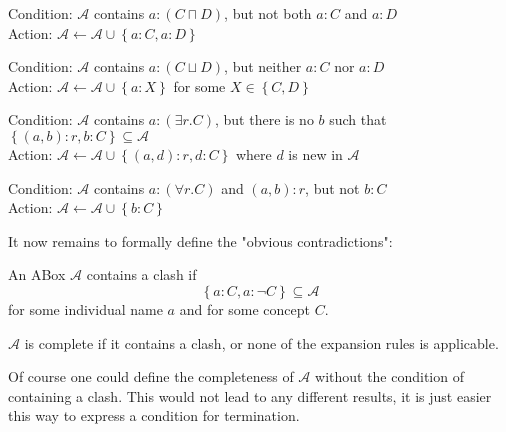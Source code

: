 \begin{mdframed}[frametitle = expansion rules]
	\begin{mdframed}[frametitle= The $\sqcap$-rule]
		Condition: $\mathcal{A}$ contains $a: (C \sqcap D)$, but not both $a:C$ and $a:D$ \\
		Action: $\mathcal{A} \leftarrow \mathcal{A} \cup \left\{ a:C, a:D \right\} $
	\end{mdframed}
	\begin{mdframed}[frametitle= The $\sqcup$-rule]
		Condition: $\mathcal{A}$ contains $a: (C \sqcup D)$, but neither $a:C$ nor $a:D$\\
		Action: $\mathcal{A} \leftarrow \mathcal{A} \cup \left\{ a:X \right\} $ for some $X \in \left\{ C,D \right\}$
	\end{mdframed}
	\begin{mdframed}[frametitle= The $\exists$-rule]
		Condition: $\mathcal{A}$ contains $a:(\exists r.C)$, but there is no $b$ such that \\$\left\{ (a,b) :r, b:C \right\} \subseteq \mathcal{A}$ \\
		Action: $\mathcal{A} \leftarrow \mathcal{A} \cup \left\{ (a,d):r, d:C \right\} $ where $d$ is new in $\mathcal{A}$
	\end{mdframed}
	\begin{mdframed}[frametitle= The $\forall$-rule]
		Condition: $\mathcal{A}$ contains $a:(\forall r.C)$ and $(a,b):r$, but not $b:C$\\
		Action: $\mathcal{A} \leftarrow \mathcal{A} \cup \left\{ b:C\right\} $
	\end{mdframed}
\end{mdframed}

It now remains to formally define the "obvious contradictions":
\begin{definition}
	An ABox $\mathcal{A}$ contains a clash if
	\[
	\left\{ a:C, a: \neg C \right\} \subseteq \mathcal{A}
	\]
	for some individual name $a$ and for some concept $C$.

	$\mathcal{A}$ is complete if it contains a clash, or none of the expansion rules is applicable.
\end{definition}
\begin{note}
	Of course one could define the completeness of $\mathcal{A}$ without the condition of containing a clash.
	This would not lead to any different results, it is just easier this way to express a condition for termination.
\end{note}
